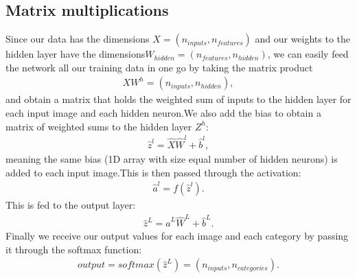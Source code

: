 \documentclass[letterpaper,10pt,english]{sphinxmanual}
\begin{document}
\subsection{Matrix multiplications}
\label{\detokenize{chapter6:matrix-multiplications}}
Since our data has the dimensions \(X = (n_{inputs}, n_{features})\) and our weights to the hidden
layer have the dimensions\(W_{hidden} = (n_{features}, n_{hidden})\),
we can easily feed the network all our training data in one go by taking the matrix product
\begin{equation*}
\begin{split} X W^{h} = (n_{inputs}, n_{hidden}),\end{split}
\end{equation*}
and obtain a matrix that holds the weighted sum of inputs to the hidden layer
for each input image and each hidden neuron.We also add the bias to obtain a matrix of weighted sums to the hidden layer \(Z^{h}\):
\begin{equation*}
\begin{split} \hat{z}^{l} = \hat{X} \hat{W}^{l} + \hat{b}^{l} ,\end{split}
\end{equation*}
meaning the same bias (1D array with size equal number of hidden neurons) is added to each input image.This is then passed through the activation:
\begin{equation*}
\begin{split} \hat{a}^{l} = f(\hat{z}^l) .\end{split}
\end{equation*}
This is fed to the output layer:
\begin{equation*}
\begin{split} \hat{z}^{L} = \hat{a}^{L} \hat{W}^{L} + \hat{b}^{L} .\end{split}
\end{equation*}
Finally we receive our output values for each image and each category by passing it through the softmax function:
\begin{equation*}
\begin{split} output = softmax (\hat{z}^{L}) = (n_{inputs}, n_{categories}) .\end{split}
\end{equation*}
\end{document}
